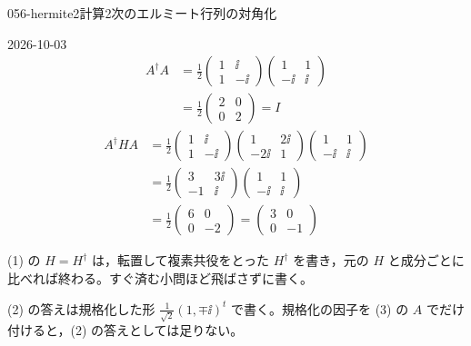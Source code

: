 \documentclass[uplatex,dvipdfmx,a4paper,11pt]{jsarticle}
\begin{document}
\begin{mondai}{056-hermite2}{計算}{2次のエルミート行列の対角化}
\begin{kotaeutsushi}{2026-10-03}
\[\]
\begin{align*}
  A^{\dagger}A&=\frac{1}{2}\begin{pmatrix}1&\ii\\1&-\ii\end{pmatrix}\begin{pmatrix}1&1\\-\ii&\ii\end{pmatrix}\\
  &=\frac{1}{2}\begin{pmatrix}2&0\\0&2\end{pmatrix}=I
\end{align*}
\begin{align*}
  A^{\dagger}HA&=\frac{1}{2}\begin{pmatrix}1&\ii\\1&-\ii\end{pmatrix}\begin{pmatrix}1&2\ii\\-2\ii&1\end{pmatrix}\begin{pmatrix}1&1\\-\ii&\ii\end{pmatrix}\\
  &=\frac{1}{2}\begin{pmatrix}3&3\ii\\-1&\ii\end{pmatrix}\begin{pmatrix}1&1\\-\ii&\ii\end{pmatrix}\\
  &=\frac{1}{2}\begin{pmatrix}6&0\\0&-2\end{pmatrix}=\begin{pmatrix}3&0\\0&-1\end{pmatrix}
\end{align*}
\end{kotaeutsushi}
\begin{kizuki}
\item (1) の $H=H^{\dagger}$ は，転置して複素共役をとった $H^{\dagger}$ を書き，元の $H$ と成分ごとに比べれば終わる。すぐ済む小問ほど飛ばさずに書く。
\item (2) の答えは規格化した形 $\frac{1}{\sqrt{2}}(1,\mp\ii)^{t}$ で書く。規格化の因子を (3) の $A$ でだけ付けると，(2) の答えとしては足りない。
\end{kizuki}
\begin{tadashii}

\end{tadashii}
\end{mondai}
\end{document}
